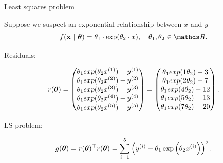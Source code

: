 \documentclass[11pt,compress,t,notes=noshow, xcolor=table]{beamer}
\begin{document}
\begin{vbframe}{Least squares problem}
\framebreak

Suppose we suspect an exponential relationship between $x$ and $y$ 
$$
\fxt = \theta_1 \cdot \exp(\theta_2 \cdot x), \quad \theta_1, \theta_2 \in \R.
$$





Residuals:
\begin{footnotesize}
$$
r(\bm{\theta}) = \begin{pmatrix} \theta_1 exp(\theta_2 x^{(1)}) - y^{(1)} \\\theta_1 exp(\theta_2 x^{(2)}) - y^{(2)}\\ \theta_1 exp(\theta_2 x^{(3)}) - y^{(3)} \\ \theta_1 exp(\theta_2 x^{(4)}) - y^{(4)} \\ \theta_1 exp(\theta_2 x^{(5)}) - y^{(5)}  \end{pmatrix} = \begin{pmatrix} 
\theta_1 exp(1 \theta_2) - 3 \\\theta_1 exp(2 \theta_2) - 7\\ \theta_1 exp(4 \theta_2) - 12 \\ \theta_1 exp(5 \theta_2) - 13 \\ \theta_1 exp(7 \theta_2) - 20
 \end{pmatrix}.
$$
\end{footnotesize}

LS problem:

$$
g(\bm{\theta}) =  r(\bm{\theta})^\top r(\bm{\theta}) = \sum_{i=1}^{5} \left(y^{(i)} - \theta_1 \exp\left(\theta_2 x^{(i)}\right)\right)^2.
$$



\end{vbframe}
\end{document}
